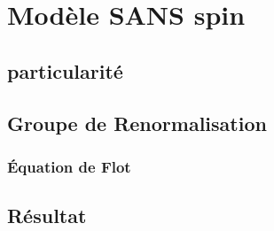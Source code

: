 \chapter{Modèle SANS spin}
\section{particularité}
\section{Groupe de Renormalisation}
\subsection{Équation de Flot}

\section{Résultat}
